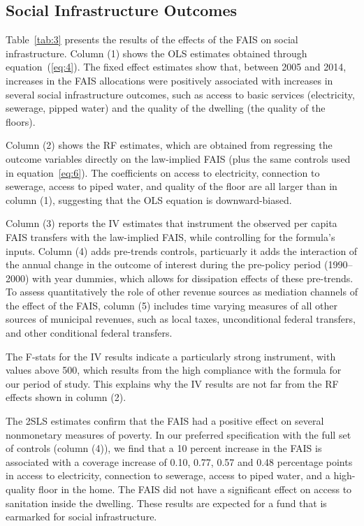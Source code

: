 \documentclass[dv_diss_main.tex]{subfiles}
\begin{document}
\subsection{Social Infrastructure Outcomes}\label{subsec:outcomes}

{Table}~\ref{tab:3} presents the results of the effects of the FAIS on social infrastructure. Column (1) shows the OLS estimates obtained through equation~(\ref{eq:4}). The fixed effect estimates show that, between 2005 and 2014, increases in the FAIS allocations were positively associated with increases in several social infrastructure outcomes, such as access to basic services (electricity, sewerage, pipped water) and the quality of the dwelling (the quality of the floors).

Column (2) shows the RF estimates, which are obtained from regressing the outcome variables directly on the law-implied FAIS (plus the same controls used in equation~\ref{eq:6}). The coefficients on access to electricity, connection to sewerage, access to piped water, and quality of the floor are all larger than in column (1), suggesting that the OLS equation is downward-biased.

Column (3) reports the IV estimates that instrument the observed per capita FAIS transfers with the law-implied FAIS, while controlling for the formula's inputs. Column (4) adds pre-trends controls, particuarly it adds the interaction of the annual change in the outcome of interest during the pre-policy period (1990–2000) with year dummies, which allows for dissipation effects of these pre-trends. To assess quantitatively the role of other revenue sources as mediation channels of the effect of the FAIS, column (5) includes time varying measures of all other sources of municipal revenues, such as local taxes, unconditional federal transfers, and other conditional federal transfers.

The F-stats for the IV results indicate a particularly strong instrument, with values above 500, which results from the high compliance with the formula for our period of study. This explains why the IV results are not far from the RF effects shown in column (2).

The 2SLS estimates confirm that the FAIS had a positive effect on several nonmonetary measures of poverty. In our preferred specification with the full set of controls (column (4)), we find that a 10 percent increase in the FAIS is associated with a coverage increase of 0.10, 0.77, 0.57 and 0.48 percentage points in access to electricity, connection to sewerage, access to piped water, and a high-quality floor in the home. The FAIS did not have a significant effect on access to sanitation inside the dwelling. These results are expected for a fund that is earmarked for social infrastructure.
\end{document}
